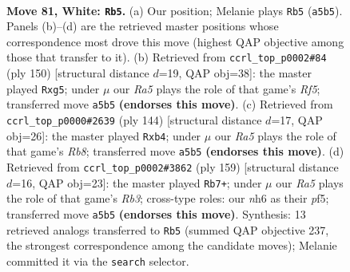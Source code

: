 \documentclass[11pt]{article}
\begin{document}
\clearpage

\begin{figure}[p]\centering
\begin{subfigure}{0.46\textwidth}\centering
\resizebox{\linewidth}{!}{%
\newchessgame
\chessboard[
  setfen={8/2k5/7n/R7/p6r/P6p/7K/8 w - - 20 81},
  showmover=false,
  pgfstyle=straightmove, color=movearrow, markmove={a5-b5}
]}
\caption{}
\end{subfigure}\hfill
\begin{subfigure}{0.46\textwidth}\centering
\resizebox{\linewidth}{!}{%
\newchessgame
\chessboard[
  setfen={8/4k3/2r5/5Rp1/6P1/8/2p5/2K5 w - - 0 76},
  showmover=false,
  pgfstyle=straightmove, color=movearrow, markmove={f5-g5}
]}
\caption{}
\end{subfigure}
\\[4pt]
\begin{subfigure}{0.46\textwidth}\centering
\resizebox{\linewidth}{!}{%
\newchessgame
\chessboard[
  setfen={1R6/8/7k/4r1p1/1p4K1/1P6/8/8 w - - 0 73},
  showmover=false,
  pgfstyle=straightmove, color=movearrow, markmove={b8-b4}
]}
\caption{}
\end{subfigure}\hfill
\begin{subfigure}{0.46\textwidth}\centering
\resizebox{\linewidth}{!}{%
\newchessgame
\chessboard[
  setfen={8/4K2k/1r5P/5P1R/8/8/8/8 b - - 22 80},
  showmover=false,
  pgfstyle=straightmove, color=movearrow, markmove={b6-b7}
]}
\caption{}
\end{subfigure}
\caption{\textbf{Move 81, White: \texttt{Rb5}.} (a) Our position; Melanie plays \texttt{Rb5} (\texttt{a5b5}). Panels (b)--(d) are the retrieved master positions whose correspondence most drove this move (highest QAP objective among those that transfer to it). (b) Retrieved from \texttt{ccrl\_top\_p0002\#84} (ply 150) [structural distance $d$=19, QAP obj=38]: the master played \texttt{Rxg5}; under $\mu$ our \emph{Ra5} plays the role of that game's \emph{Rf5}; transferred move \texttt{a5b5} \textbf{(endorses this move)}. (c) Retrieved from \texttt{ccrl\_top\_p0000\#2639} (ply 144) [structural distance $d$=17, QAP obj=26]: the master played \texttt{Rxb4}; under $\mu$ our \emph{Ra5} plays the role of that game's \emph{Rb8}; transferred move \texttt{a5b5} \textbf{(endorses this move)}. (d) Retrieved from \texttt{ccrl\_top\_p0002\#3862} (ply 159) [structural distance $d$=16, QAP obj=23]: the master played \texttt{Rb7+}; under $\mu$ our \emph{Ra5} plays the role of that game's \emph{Rb3}; cross-type roles: our \emph{n}h6 as their \emph{p}f5; transferred move \texttt{a5b5} \textbf{(endorses this move)}. Synthesis: 13 retrieved analogs transferred to \texttt{Rb5} (summed QAP objective 237, the strongest correspondence among the candidate moves); Melanie committed it via the \texttt{search} selector.}
\label{fig:thought-m160}
\end{figure}
\end{document}
